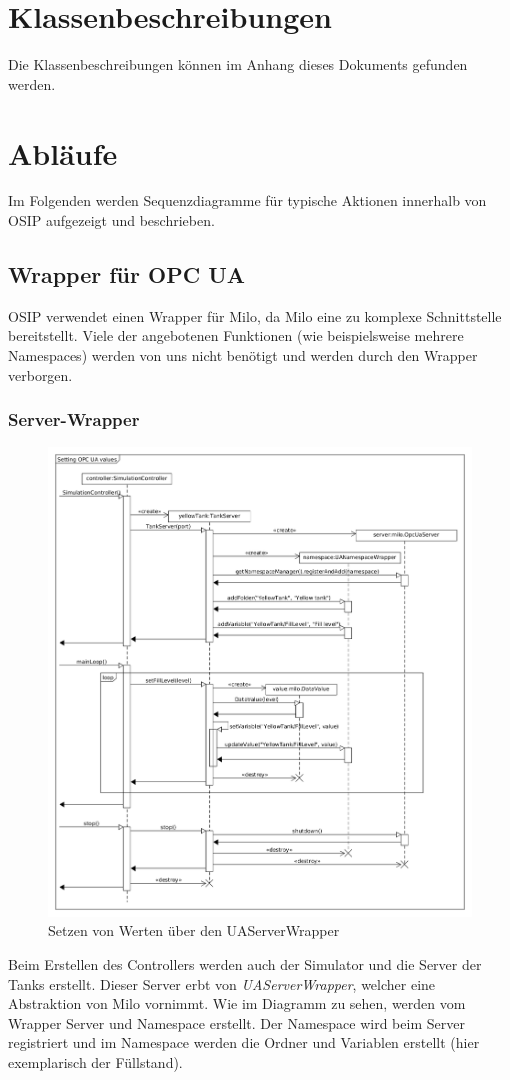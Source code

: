 \documentclass[parskip=full]{scrartcl}
\begin{document}
\section{Klassenbeschreibungen}
Die Klassenbeschreibungen können im Anhang dieses Dokuments gefunden werden.

\section{Abläufe}
Im Folgenden werden Sequenzdiagramme für typische Aktionen innerhalb von OSIP aufgezeigt und beschrieben.
\subsection{Wrapper für OPC UA}
OSIP verwendet einen Wrapper für Milo, da Milo eine zu komplexe Schnittstelle bereitstellt.
Viele der angebotenen Funktionen (wie beispielsweise mehrere Namespaces) werden von uns nicht benötigt
und werden durch den Wrapper verborgen.


\subsubsection{Server-Wrapper}
\begin{figure}[H]
  \centering
  \includegraphics[scale=0.38]{design/sequence-diagrams/sequence-set-server-value.png}
  \caption{Setzen von Werten über den UAServerWrapper}
\end{figure}
Beim Erstellen des Controllers werden auch der Simulator und die Server der Tanks erstellt.
Dieser Server erbt von \emph{UAServerWrapper}, welcher eine Abstraktion von Milo vornimmt. Wie im Diagramm zu sehen,
werden vom Wrapper Server und Namespace erstellt. Der Namespace wird beim Server registriert und
im Namespace werden die Ordner und Variablen erstellt (hier exemplarisch der Füllstand).
\end{document}
